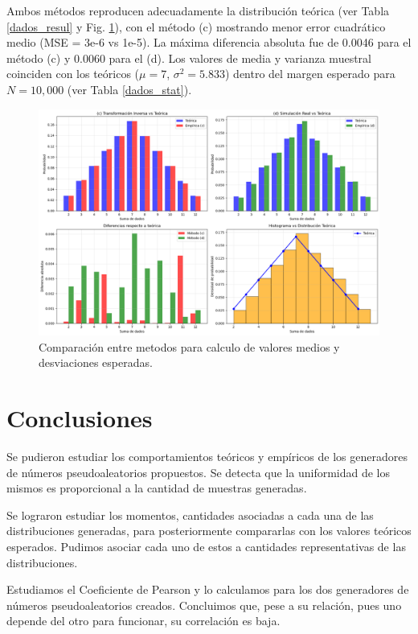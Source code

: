 \documentclass[baaa]{baaa}
\begin{document}
Ambos métodos reproducen adecuadamente la distribución teórica (ver Tabla \ref{dados_resul} y Fig. \ref{dados}), con el método (c) mostrando menor error cuadrático medio (MSE = 3e-6 vs 1e-5). La máxima diferencia absoluta fue de 0.0046 para el método (c) y 0.0060 para el (d). Los valores de media y varianza muestral coinciden con los teóricos (\(\mu = 7\), \(\sigma^2 = 5.833\)) dentro del margen esperado para \(N = 10,000\) (ver Tabla \ref{dados_stat}).

\begin{figure}[!h]
    \centering
    \includegraphics[width=1\linewidth]{imagenes/dados.png}
    \caption{Comparación entre metodos para calculo de valores medios y desviaciones esperadas.}
    \label{dados}
\end{figure}


\section{Conclusiones}
Se pudieron estudiar los comportamientos teóricos y empíricos de los generadores de números pseudoaleatorios propuestos. Se detecta que la uniformidad de los mismos es proporcional a la cantidad de muestras generadas.

Se lograron estudiar los momentos, cantidades asociadas a cada una de las distribuciones generadas, para posteriormente compararlas con los valores teóricos esperados. Pudimos asociar cada uno de estos a cantidades representativas de las distribuciones.

Estudiamos el Coeficiente de Pearson y lo calculamos para los dos generadores de números pseudoaleatorios creados. Concluimos que, pese a su relación, pues uno depende del otro para funcionar, su correlación es baja.
\end{document}
